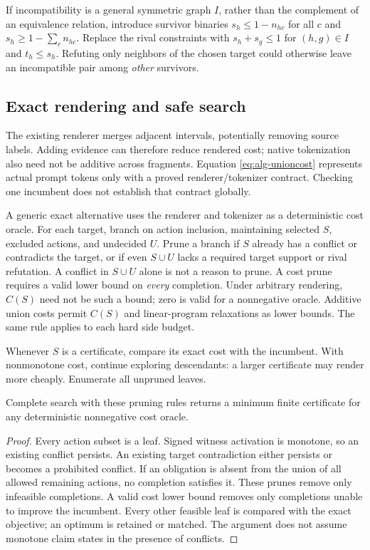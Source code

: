 If incompatibility is a general symmetric graph $I$, rather than the
complement of an equivalence relation, introduce survivor binaries
$s_h\leq1-n_{hc}$ for all $c$ and
$s_h\geq1-\sum_c n_{hc}$. Replace the rival constraints with
$s_h+s_g\leq1$ for $(h,g)\in I$ and $t_h\leq s_h$. Refuting only neighbors
of the chosen target could otherwise leave an incompatible pair among
\emph{other} survivors.

\subsection{Exact rendering and safe search}

The existing renderer merges adjacent intervals, potentially removing source
labels. Adding evidence can therefore reduce rendered cost; native
tokenization also need not be additive across fragments. Equation
\eqref{eq:alg-unioncost} represents actual prompt tokens only with a proved
renderer/tokenizer contract. Checking one incumbent does not establish that
contract globally.

A generic exact alternative uses the renderer and tokenizer as a deterministic
cost oracle. For each target, branch on action inclusion, maintaining selected
$S$, excluded actions, and undecided $U$. Prune a branch if $S$ already has a
conflict or contradicts the target, or if even $S\cup U$ lacks a required
target support or rival refutation. A conflict in $S\cup U$ alone is not a
reason to prune. A cost prune requires a valid lower bound on \emph{every}
completion. Under arbitrary rendering, $C(S)$ need not be such a bound;
zero is valid for a nonnegative oracle. Additive union costs permit $C(S)$
and linear-program relaxations as lower bounds. The same rule applies to
each hard side budget.

Whenever $S$ is a certificate, compare its exact cost with the incumbent.
With nonmonotone cost, continue exploring descendants: a larger certificate
may render more cheaply. Enumerate all unpruned leaves.

\begin{proposition}
Complete search with these pruning rules returns a minimum finite
certificate for any deterministic nonnegative cost oracle.
\end{proposition}
\begin{proof}
Every action subset is a leaf. Signed witness activation is monotone, so an
existing conflict persists. An existing target contradiction either persists
or becomes a prohibited conflict. If an obligation is absent from the union
of all allowed remaining actions, no completion satisfies it. These prunes
remove only infeasible completions. A valid cost lower bound removes only
completions unable to improve the incumbent. Every other feasible leaf is
compared with the exact objective; an optimum is retained or matched. The
argument does not assume monotone claim states in the presence of conflicts.
\end{proof}


